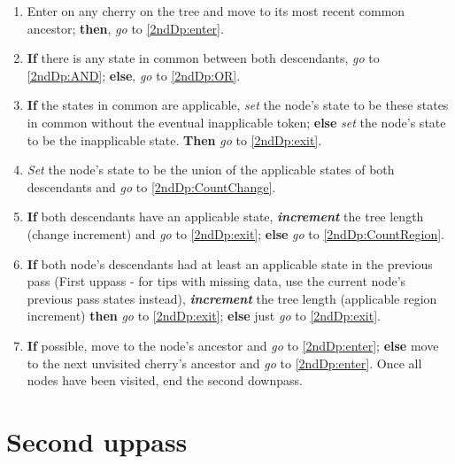 \documentclass[a4paper,12pt]{article}
\begin{document}
\begin{enumerate}
    \item  Enter on any cherry on the tree and move to its most recent common ancestor; \textbf{then}, \textit{go} to \ref{2ndDp:enter}.
    \item \label{2ndDp:enter} \textbf{If} there is any state in common between both descendants, \textit{go} to \ref{2ndDp:AND}; \textbf{else}, \textit{go} to \ref{2ndDp:OR}.
    \item \label{2ndDp:AND} \textbf{If} the states in common are applicable, \textit{set} the node's state to be these states in common without the eventual inapplicable token; \textbf{else} \textit{set} the node's state to be the inapplicable state. \textbf{Then} \textit{go} to \ref{2ndDp:exit}. 
    \item \label{2ndDp:OR} \textit{Set} the node's state to be the union of the applicable states of both descendants and \textit{go} to \ref{2ndDp:CountChange}.
    \item \label{2ndDp:CountChange} \textbf{If} both descendants have an applicable state, \textbf{\textit{increment}} the tree length (change increment) and \textit{go} to \ref{2ndDp:exit}; \textbf{else} \textit{go} to \ref{2ndDp:CountRegion}.
    \item \label{2ndDp:CountRegion} \textbf{If} both node's descendants had at least an applicable state in the previous pass (First uppass - for tips with missing data, use the current node's previous pass states instead), \textbf{\textit{increment}} the tree length (applicable region increment) \textbf{then} \textit{go} to \ref{2ndDp:exit}; \textbf{else} just \textit{go} to \ref{2ndDp:exit}.
    \item \label{2ndDp:exit} \textbf{If} possible, move to the node's ancestor and \textit{go} to \ref{2ndDp:enter}; \textbf{else} move to the next unvisited cherry's ancestor and \textit{go} to \ref{2ndDp:enter}. Once all nodes have been visited, end the second downpass.
\end{enumerate}

\section{Second uppass} \label{2ndUp}
\end{document}
